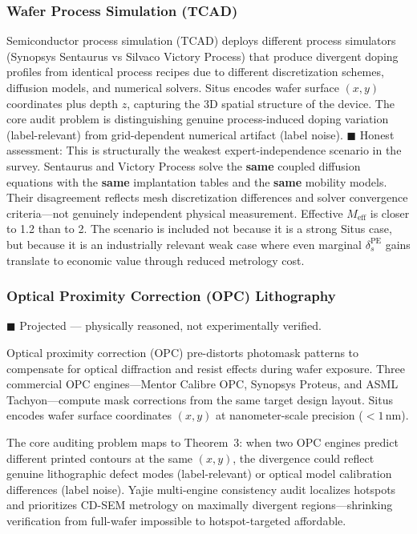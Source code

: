 \documentclass[12pt,a4paper]{article}
\begin{document}
\subsubsection{Wafer Process Simulation (TCAD)}

Semiconductor process simulation (TCAD\cite{sentaurus,silvaco}) deploys different process simulators (Synopsys Sentaurus vs Silvaco Victory Process) that produce divergent doping profiles from identical process recipes due to different discretization schemes, diffusion models, and numerical solvers. Situs encodes wafer surface $(x,y)$ coordinates plus depth $z$, capturing the 3D spatial structure of the device. The core audit problem is distinguishing genuine process-induced doping variation (label-relevant) from grid-dependent numerical artifact (label noise). \textcolor{warning}{$\blacksquare$ Honest assessment}: This is structurally the weakest expert-independence scenario in the survey. Sentaurus and Victory Process solve the \textbf{same} coupled diffusion equations with the \textbf{same} implantation tables and the \textbf{same} mobility models. Their disagreement reflects mesh discretization differences and solver convergence criteria—not genuinely independent physical measurement. Effective $M_{\text{eff}}$ is closer to 1.2 than to 2. The scenario is included not because it is a strong Situs case, but because it is an industrially relevant weak case where even marginal $\delta_s^{\mathrm{PE}}$ gains translate to economic value through reduced metrology cost.

\subsubsection{Optical Proximity Correction (OPC) Lithography}

\textcolor{projected}{$\blacksquare$ Projected — physically reasoned, not experimentally verified.}

Optical proximity correction (OPC) pre-distorts photomask patterns to compensate for optical diffraction and resist effects during wafer exposure. Three commercial OPC engines—Mentor Calibre OPC, Synopsys Proteus, and ASML Tachyon—compute mask corrections from the same target design layout. Situs encodes wafer surface coordinates $(x,y)$ at nanometer-scale precision ($<1$\,nm).

The core auditing problem maps to Theorem~3: when two OPC engines predict different printed contours at the same $(x,y)$, the divergence could reflect genuine lithographic defect modes (label-relevant) or optical model calibration differences (label noise). Yajie multi-engine consistency audit localizes hotspots and prioritizes CD-SEM metrology on maximally divergent regions—shrinking verification from full-wafer impossible to hotspot-targeted affordable.
\end{document}
